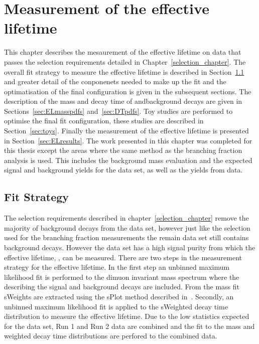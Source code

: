 \chapter{Measurement of the \bsmumu effective lifetime}
\label{sec:lifetimemeasurement}

This chapter describes the mesaurement of the \bsmumu effective lifetime on data that passes the selection requirements detailed in Chapter~\ref{selection_chapter}. The overall fit strategy to measure the effective lifetime is described in Section~\ref{sec:fitstrategy} and greater detail of the conponenets needed to make up the fit and the optimatisation of the final configuration is given in the subsequent sections. The description of the mass and decay time \pdfs of \bmumu  andbackground decays are given in Sections~\ref{sec:ELmasspdfs} and~\ref{sec:DTpdfs}. Toy studies are performed to optimise the final fit configuration, these studies are described in Section~\ref{sec:toys}. Finally the measurement of the \bsmumu effective lifetime is presented in Section~\ref{sec:ELresults}.
The work presented in this chapter was completed for this thesis except the areas where the same method as the branching fraction analysis is used. This includes the background mass \pdf evaluation and the expected signal and background yields for the data set, as well as the \bsjpisphi yields from data. 


\section{Fit Strategy}
\label{sec:fitstrategy}

The selection requirements described in chapter~\ref{selection_chapter} remove the majority of background decays from the data set, however just like the selection used for the branching fraction measurements the remain data set still contains background decays. However the data set has a high signal purity from which the \bsmumu effective lifetime, \tmumu, can be measured. There are two steps in the measurement strategy for the effective lifetime. In the first step an unbinned maximum likelihood fit is performed to the dimuon invariant mass spectrum where the \pdfs describing the \bsmumu signal and background decays are included. From the mass fit sWeights are extracted using the sPlot method described in~\cite{Pivk:2004ty}. Secondly, an unbinned maximum likelihood fit is applied to the sWeighted decay time distribution to measure the \bsmumu effective lifetime. Due to the low statistics expected for the data set, Run 1 and Run 2 data are combined and the \ml fit to the mass and weighted decay time distributions are perfored to the combined data.

